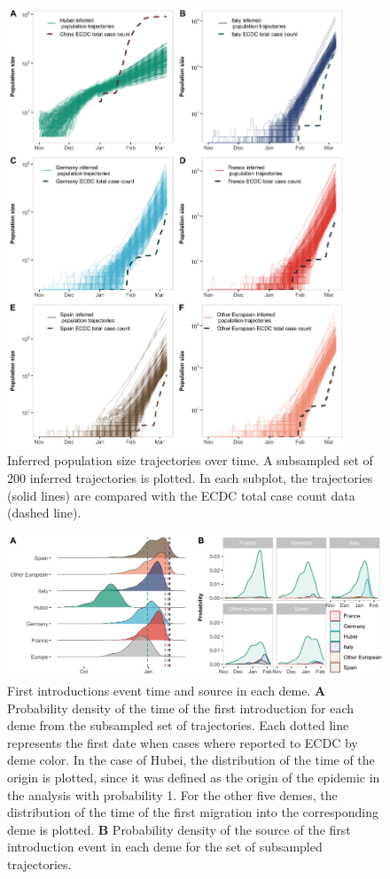 \documentclass[12pt,]{article}
\begin{document}
\begin{figure}[h!]
    \centering
    \includegraphics[width=0.9\textwidth]{201014_europe2_figtraj02.png}
    \caption{Inferred population size trajectories over time. A subsampled set of 200 inferred trajectories is plotted. In each subplot, the trajectories (solid lines) are compared with the ECDC total case count data (dashed line).}
    \label{fig:trajs}
\end{figure}


\begin{figure}[ht]
    \centering
    \includegraphics[width=\textwidth]{201014_europe2_figtraj03.png}
    \caption{First introductions event time and source in each deme. \textbf{A} Probability density of the time of the first introduction for each deme from the subsampled set of trajectories. Each dotted line represents the first date when cases where reported to ECDC by deme color. In the case of Hubei, the distribution of the time of the origin is plotted, since it was defined as the origin of the epidemic in the analysis with probability 1. For the other five demes, the distribution of the time of the first migration into the corresponding deme is plotted. \textbf{B} Probability density of the source of the first introduction event in each deme for the set of subsampled trajectories.}
    \label{fig:first}
\end{figure}
\end{document}
